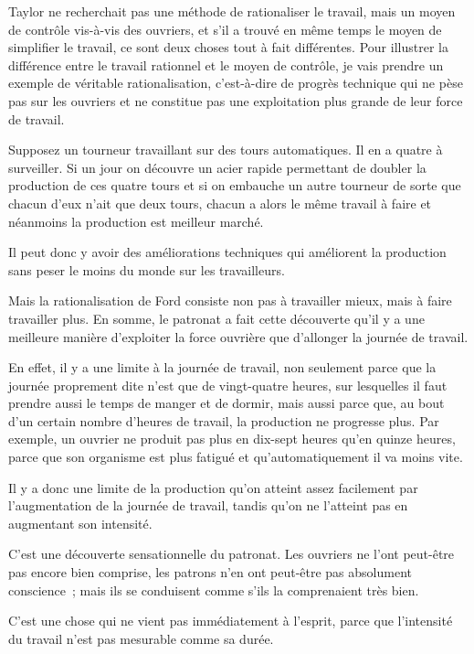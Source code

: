 \documentclass[french,twoside]{book} %
\begin{document}
Taylor ne recherchait pas une méthode de rationaliser le travail, mais un moyen de contrôle vis-à-vis des ouvriers, et s'il a trouvé en même temps le moyen de simplifier le travail, ce sont deux choses tout à fait différentes. Pour illustrer la différence entre le travail rationnel et le moyen de contrôle, je vais prendre un exemple de véritable rationalisation, c'est-à-dire de progrès technique qui ne pèse pas sur les ouvriers et ne constitue pas une exploitation plus grande de leur force de travail.\par
Supposez un tourneur travaillant sur des tours automatiques. Il en a quatre à surveiller. Si un jour on découvre un acier rapide permettant de doubler la production de ces quatre tours et si on embauche un autre tourneur de sorte que chacun d'eux n'ait que deux tours, chacun a alors le même travail à faire et néanmoins la production est meilleur marché.\par
Il peut donc y avoir des améliorations techniques qui améliorent la production sans peser le moins du monde sur les travailleurs.\par
Mais la rationalisation de Ford consiste non pas à travailler mieux, mais à faire travailler plus. En somme, le patronat a fait cette découverte qu'il y a une meilleure manière d'exploiter la force ouvrière que d'allonger la journée de travail.\par
\par
En effet, il y a une limite à la journée de travail, non seulement parce que la journée proprement dite n'est que de vingt-quatre heures, sur lesquelles il faut prendre aussi le temps de manger et de dormir, mais aussi parce que, au bout d'un certain nombre d'heures de travail, la production ne progresse plus. Par exemple, un ouvrier ne produit pas plus en dix-sept heures qu'en quinze heures, parce que son organisme est plus fatigué et qu'automatiquement il va moins vite.\par
Il y a donc une limite de la production qu'on atteint assez facilement par l'augmentation de la journée de travail, tandis qu'on ne l'atteint pas en augmentant son intensité.\par
C'est une découverte sensationnelle du patronat. Les ouvriers ne l'ont peut-être pas encore bien comprise, les patrons n'en ont peut-être pas absolument conscience ; mais ils se conduisent comme s'ils la comprenaient très bien.\par
C'est une chose qui ne vient pas immédiatement à l'esprit, parce que l'intensité du travail n'est pas mesurable comme sa durée.\par
\end{document}
